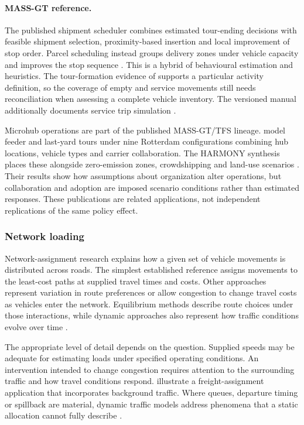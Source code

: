 \paragraph{MASS-GT reference.}
The published shipment scheduler combines estimated tour-ending decisions with
feasible shipment selection, proximity-based insertion and local improvement
of stop order. Parcel scheduling instead groups delivery zones under vehicle
capacity and improves the stop sequence \parencite{massgt2025}. This is a hybrid
of behavioural estimation and heuristics. The tour-formation evidence of
\textcite{thoen2020} supports a particular activity definition, so the coverage
of empty and service movements still needs reconciliation when assessing a
complete vehicle inventory. The versioned manual additionally documents service
trip simulation \parencite{massgtmanual2023}.

Microhub operations are part of the published MASS-GT/TFS lineage.
\Textcite{microhubs2024} model feeder and last-yard tours under nine Rotterdam
configurations combining hub locations, vehicle types and carrier collaboration.
The HARMONY synthesis places these alongside zero-emission zones, crowdshipping
and land-use scenarios \parencite{harmony2024}. Their results show how assumptions
about organization alter operations, but collaboration and adoption are imposed
scenario conditions rather than estimated responses. These publications are
related applications, not independent replications of the same policy effect.

\subsubsection{Network loading}\label{sec:f6}
Network-assignment research explains how a given set of vehicle movements is
distributed across roads. The simplest established reference assigns movements
to the least-cost paths at supplied travel times and costs. Other approaches
represent variation in route preferences or allow congestion to change travel
costs as vehicles enter the network. Equilibrium methods describe route choices
under those interactions, while dynamic approaches also represent how traffic
conditions evolve over time \parencite{sheffi1985,wang2018}.

The appropriate level of detail depends on the question. Supplied speeds may be
adequate for estimating loads under specified operating conditions. An
intervention intended to change congestion requires attention to the surrounding
traffic and how travel conditions respond. \Textcite{hwang2021} illustrate a
freight-assignment application that incorporates background traffic. Where
queues, departure timing or spillback are material, dynamic traffic models
address phenomena that a static allocation cannot fully describe
\parencite{wang2018}.

